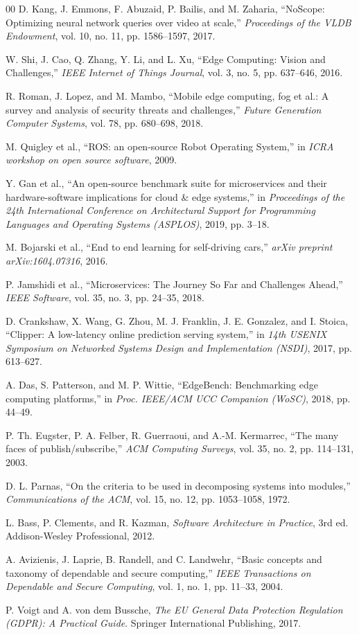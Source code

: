 \documentclass[conference]{IEEEtran}
\begin{document}
\begin{thebibliography}{00}
 D. Kang, J. Emmons, F. Abuzaid, P. Bailis, and M. Zaharia, ``NoScope: Optimizing neural network queries over video at scale,'' \textit{Proceedings of the VLDB Endowment}, vol. 10, no. 11, pp. 1586--1597, 2017.

 W. Shi, J. Cao, Q. Zhang, Y. Li, and L. Xu, ``Edge Computing: Vision and Challenges,'' \textit{IEEE Internet of Things Journal}, vol. 3, no. 5, pp. 637--646, 2016.

 R. Roman, J. Lopez, and M. Mambo, ``Mobile edge computing, fog et al.: A survey and analysis of security threats and challenges,'' \textit{Future Generation Computer Systems}, vol. 78, pp. 680--698, 2018.

 M. Quigley et al., ``ROS: an open-source Robot Operating System,'' in \textit{ICRA workshop on open source software}, 2009.

 Y. Gan et al., ``An open-source benchmark suite for microservices and their hardware-software implications for cloud \& edge systems,'' in \textit{Proceedings of the 24th International Conference on Architectural Support for Programming Languages and Operating Systems (ASPLOS)}, 2019, pp. 3--18.

 M. Bojarski et al., ``End to end learning for self-driving cars,'' \textit{arXiv preprint arXiv:1604.07316}, 2016.

 P. Jamshidi et al., ``Microservices: The Journey So Far and Challenges Ahead,'' \textit{IEEE Software}, vol. 35, no. 3, pp. 24--35, 2018.

 D. Crankshaw, X. Wang, G. Zhou, M. J. Franklin, J. E. Gonzalez, and I. Stoica, ``Clipper: A low-latency online prediction serving system,'' in \textit{14th USENIX Symposium on Networked Systems Design and Implementation (NSDI)}, 2017, pp. 613--627.

 A. Das, S. Patterson, and M. P. Wittie, ``EdgeBench: Benchmarking edge computing platforms,'' in \textit{Proc. IEEE/ACM UCC Companion (WoSC)}, 2018, pp. 44--49.

 P. Th. Eugster, P. A. Felber, R. Guerraoui, and A.-M. Kermarrec, ``The many faces of publish/subscribe,'' \textit{ACM Computing Surveys}, vol. 35, no. 2, pp. 114--131, 2003.

 D. L. Parnas, ``On the criteria to be used in decomposing systems into modules,'' \textit{Communications of the ACM}, vol. 15, no. 12, pp. 1053--1058, 1972.

 L. Bass, P. Clements, and R. Kazman, \textit{Software Architecture in Practice}, 3rd ed. Addison-Wesley Professional, 2012.

 A. Avizienis, J. Laprie, B. Randell, and C. Landwehr, ``Basic concepts and taxonomy of dependable and secure computing,'' \textit{IEEE Transactions on Dependable and Secure Computing}, vol. 1, no. 1, pp. 11--33, 2004.

 P. Voigt and A. von dem Bussche, \textit{The EU General Data Protection Regulation (GDPR): A Practical Guide}. Springer International Publishing, 2017.

\end{thebibliography}
\end{document}
